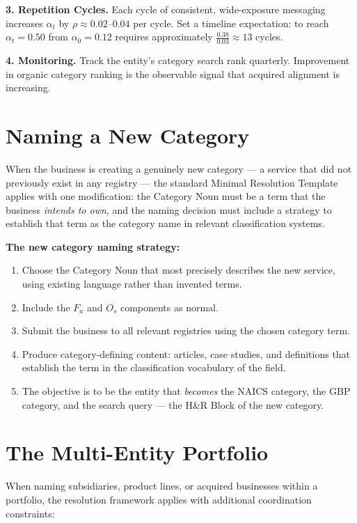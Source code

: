 \documentclass[12pt, openany]{book}
\theoremstyle{thmstyle}
\theoremstyle{defstyle}
\begin{document}
\textbf{3. Repetition Cycles.} Each cycle of consistent, wide-exposure messaging increases $\alpha_t$ by $\rho \approx 0.02$--$0.04$ per cycle. Set a timeline expectation: to reach $\alpha_t = 0.50$ from $\alpha_0 = 0.12$ requires approximately $\frac{0.38}{0.03} \approx 13$ cycles.

\textbf{4. Monitoring.} Track the entity's category search rank quarterly. Improvement in organic category ranking is the observable signal that acquired alignment is increasing.

\section{Naming a New Category}

When the business is creating a genuinely new category --- a service that did not previously exist in any registry --- the standard Minimal Resolution Template applies with one modification: the Category Noun must be a term that the business \textit{intends to own}, and the naming decision must include a strategy to establish that term as the category name in relevant classification systems.

\textbf{The new category naming strategy:}
\begin{enumerate}[leftmargin=1.5em]
  \item Choose the Category Noun that most precisely describes the new service, using existing language rather than invented terms.
  \item Include the $F_a$ and $O_s$ components as normal.
  \item Submit the business to all relevant registries using the chosen category term.
  \item Produce category-defining content: articles, case studies, and definitions that establish the term in the classification vocabulary of the field.
  \item The objective is to be the entity that \textit{becomes} the NAICS category, the GBP category, and the search query --- the H\&R Block of the new category.
\end{enumerate}

\section{The Multi-Entity Portfolio}

When naming subsidiaries, product lines, or acquired businesses within a portfolio, the resolution framework applies with additional coordination constraints:
\end{document}
